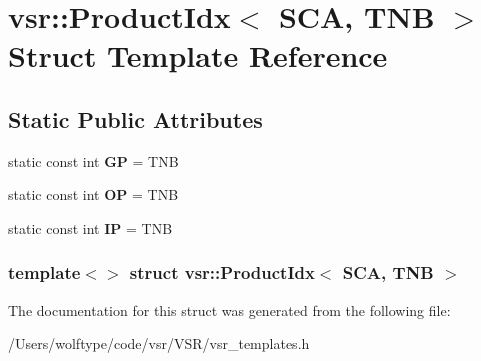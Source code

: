 \hypertarget{structvsr_1_1_product_idx_3_01_s_c_a_00_01_t_n_b_01_4}{\section{vsr\-:\-:Product\-Idx$<$ S\-C\-A, T\-N\-B $>$ Struct Template Reference}
\label{structvsr_1_1_product_idx_3_01_s_c_a_00_01_t_n_b_01_4}
}
\subsection*{Static Public Attributes}
\begin{DoxyCompactItemize}
\item 
\hypertarget{structvsr_1_1_product_idx_3_01_s_c_a_00_01_t_n_b_01_4_a992d719ad494a1fe6a021dc4ee07c056}{static const int {\bfseries G\-P} = T\-N\-B}\label{structvsr_1_1_product_idx_3_01_s_c_a_00_01_t_n_b_01_4_a992d719ad494a1fe6a021dc4ee07c056}

\item 
\hypertarget{structvsr_1_1_product_idx_3_01_s_c_a_00_01_t_n_b_01_4_aa2ac77fc5f54924d80ec307edaf7a019}{static const int {\bfseries O\-P} = T\-N\-B}\label{structvsr_1_1_product_idx_3_01_s_c_a_00_01_t_n_b_01_4_aa2ac77fc5f54924d80ec307edaf7a019}

\item 
\hypertarget{structvsr_1_1_product_idx_3_01_s_c_a_00_01_t_n_b_01_4_a92e257b87b8a55517eea344582c4fe78}{static const int {\bfseries I\-P} = T\-N\-B}\label{structvsr_1_1_product_idx_3_01_s_c_a_00_01_t_n_b_01_4_a92e257b87b8a55517eea344582c4fe78}

\end{DoxyCompactItemize}
\subsubsection*{template$<$$>$ struct vsr\-::\-Product\-Idx$<$ S\-C\-A, T\-N\-B $>$}



The documentation for this struct was generated from the following file\-:\begin{DoxyCompactItemize}
\item 
/\-Users/wolftype/code/vsr/\-V\-S\-R/vsr\-\_\-templates.\-h\end{DoxyCompactItemize}
